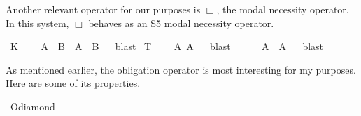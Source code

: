 \begin{isabellebody}
{\isafolddocument}%
%
\isadelimdocument
%
\endisadelimdocument
%
\begin{isamarkuptext}%
Another relevant operator for our purposes is $\Box$, the modal necessity operator. In 
this system, $\Box$ behaves as an S5 modal necessity operator.%
\end{isamarkuptext}\isamarkuptrue%
\isamarkupfalse%
\ K{\isacharcolon}\isanewline
\ \ \ {\isachardoublequoteopen}{\isasymTurnstile}\ {\isacharparenleft}{\isacharparenleft}{\isasymbox}{\isacharparenleft}A\ \isactrlbold {\isasymrightarrow}\ B{\isacharparenright}{\isacharparenright}\ \isactrlbold {\isasymrightarrow}\ {\isacharparenleft}{\isacharparenleft}{\isasymbox}A{\isacharparenright}\ \isactrlbold {\isasymrightarrow}\ {\isacharparenleft}{\isasymbox}B{\isacharparenright}{\isacharparenright}{\isacharparenright}{\isachardoublequoteclose}%
\isadelimproof
\ %
\endisadelimproof
%
\isatagproof
{}\isamarkupfalse%
\ blast%
\endisatagproof
{\isafoldproof}%
%
\isadelimproof
%
\endisadelimproof
\isanewline
\isanewline
{}\isamarkupfalse%
\ T{\isacharcolon}\isanewline
\ \ \ {\isachardoublequoteopen}{\isasymTurnstile}\ {\isacharparenleft}{\isacharparenleft}{\isasymbox}A{\isacharparenright}\ \isactrlbold {\isasymrightarrow}A{\isacharparenright}{\isachardoublequoteclose}%
\isadelimproof
\ %
\endisadelimproof
%
\isatagproof
{}\isamarkupfalse%
\ blast%
\endisatagproof
{\isafoldproof}%
%
\isadelimproof
%
\endisadelimproof
\isanewline
\isanewline
{}\isamarkupfalse%
\ {}{\isacharcolon}\isanewline
\ \ \ {\isachardoublequoteopen}{\isasymTurnstile}\ {\isacharparenleft}{\isacharparenleft}{\isasymdiamond}A{\isacharparenright}\ \isactrlbold {\isasymrightarrow}\ {\isacharparenleft}{\isasymbox}{\isacharparenleft}{\isasymdiamond}A{\isacharparenright}{\isacharparenright}{\isacharparenright}{\isachardoublequoteclose}%
\isadelimproof
\ %
\endisadelimproof
%
\isatagproof
{}\isamarkupfalse%
\ blast\isanewline
%
\endisatagproof
{\isafoldproof}%
%
\isadelimproof
%
\endisadelimproof
%
\isadelimdocument
%
\endisadelimdocument
%
\isatagdocument
%
\endisatagdocument
{\isafolddocument}%
%
\isadelimdocument
%
\endisadelimdocument
%
\begin{isamarkuptext}%
As mentioned earlier, the obligation operator is most interesting for my purposes. Here are some 
of its properties.%
\end{isamarkuptext}\isamarkuptrue%
\isamarkupfalse%
\ O{\isacharunderscore}diamond{\isacharcolon}\isanewline

\end{isabellebody}
